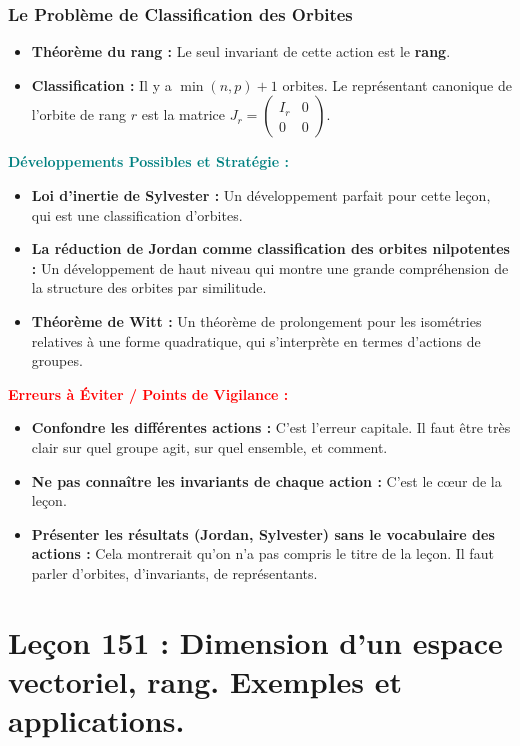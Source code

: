 \documentclass[12pt, a4paper, parskip=full]{report}
\theoremstyle{agregstyle}
\newenvironment{developpements}
  {\par\medskip\noindent\begin{oframed}\noindent\textbf{\textcolor{teal}{Développements Possibles et Stratégie :}}}
  {\end{oframed}\par\medskip}
\newenvironment{erreurs}
  {\par\medskip\noindent\begin{oframed}\noindent\textbf{\textcolor{red}{Erreurs à Éviter / Points de Vigilance :}}}
  {\end{oframed}\par\medskip}
\begin{document}
\subsection{Le Problème de Classification des Orbites}
\begin{itemize}
    \item \textbf{Théorème du rang :} Le seul invariant de cette action est le \textbf{rang}.
    \item \textbf{Classification :} Il y a $\min(n,p)+1$ orbites. Le représentant canonique de l'orbite de rang $r$ est la matrice $J_r = \begin{pmatrix} I_r & 0 \\ 0 & 0 \end{pmatrix}$.
\end{itemize}

\begin{developpements}
    \begin{itemize}
        \item \textbf{Loi d'inertie de Sylvester :} Un développement parfait pour cette leçon, qui est une classification d'orbites.
        \item \textbf{La réduction de Jordan comme classification des orbites nilpotentes :} Un développement de haut niveau qui montre une grande compréhension de la structure des orbites par similitude.
        \item \textbf{Théorème de Witt :} Un théorème de prolongement pour les isométries relatives à une forme quadratique, qui s'interprète en termes d'actions de groupes.
    \end{itemize}
\end{developpements}

\begin{erreurs}
    \begin{itemize}
        \item \textbf{Confondre les différentes actions :} C'est l'erreur capitale. Il faut être très clair sur quel groupe agit, sur quel ensemble, et comment.
        \item \textbf{Ne pas connaître les invariants de chaque action :} C'est le cœur de la leçon.
        \item \textbf{Présenter les résultats (Jordan, Sylvester) sans le vocabulaire des actions :} Cela montrerait qu'on n'a pas compris le titre de la leçon. Il faut parler d'orbites, d'invariants, de représentants.
    \end{itemize}
\end{erreurs}
\chapter{Leçon 151 : Dimension d'un espace vectoriel, rang. Exemples et applications.}
\end{document}
